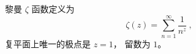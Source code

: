 
\begin{issues}
\issueDraft
\end{issues}


黎曼 $\zeta$ 函数定义为
\begin{equation}
\zeta(z) = \sum_{n=1}^\infty \frac{1}{n^z}~,
\end{equation}
复平面上唯一的极点是 $z = 1$， 留数为 $1$。
